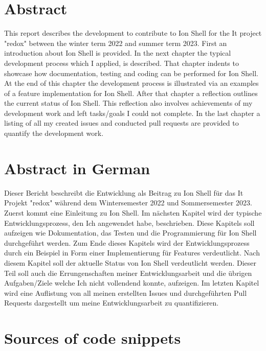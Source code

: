 \thispagestyle{empty}

\section{Abstract}

This report describes the development to contribute to Ion Shell for the It project "redox"
between the winter term 2022 and summer term 2023.
First an introduction about Ion Shell is provided.
In the next chapter the typical development process which I applied, is described.
That chapter indents to showcase how documentation, testing and coding can be performed for Ion Shell.
At the end of this chapter the development process is illustrated via an examples of a feature implementation for Ion Shell.
After that chapter a reflection outlines the current status of Ion Shell.
This reflection also involves achievements of my development work and left tasks/goals I could not complete.
In the last chapter a listing of all my created issues and conducted pull requests are provided to quantify the development work.

\section{Abstract in German}

Dieser Bericht beschreibt die Entwicklung als Beitrag zu Ion Shell für das It Projekt "redox"
während dem Wintersemester 2022 und Sommersemester 2023.
Zuerst kommt eine Einleitung zu Ion Shell.
Im nächsten Kapitel wird der typische Entwicklungsprozess, den Ich angewendet habe, beschrieben.
Diese Kapitels soll aufzeigen wie Dokumentation, das Testen und die Programmierung für Ion Shell durchgeführt werden.
Zum Ende dieses Kapitels wird der Entwicklungsprozess durch ein Beispiel in Form einer Implementierung für Features verdeutlicht.
Nach diesem Kapitel soll der aktuelle Status von Ion Shell verdeutlicht werden.
Dieser Teil soll auch die Errungenschaften meiner Entwicklungsarbeit und die übrigen Aufgaben/Ziele welche Ich nicht vollendend konnte, aufzeigen.
Im letzten Kapitel wird eine Auflistung von all meinen erstellten Issues und durchgeführten Pull Requests dargestellt um
meine Entwicklungsarbeit zu quantifizieren.

\clearpage

\section{Sources of code snippets}

